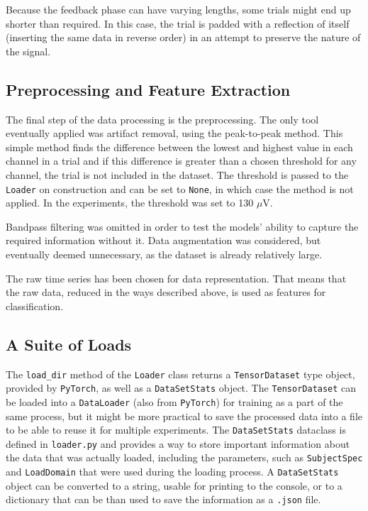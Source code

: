 \documentclass[english, he, bc, kiv, iso690alph]{fasthesis}
\begin{document}
Because the feedback phase can have varying lengths, some trials might end up shorter than required. In this case, the trial is padded with a reflection of itself (inserting the same data in reverse order) in an attempt to preserve the nature of the signal.

\subsection{Preprocessing and Feature Extraction}

The final step of the data processing is the preprocessing. The only tool eventually applied was artifact removal, using the peak-to-peak method. This simple method finds the difference between the lowest and highest value in each channel in a trial and if this difference is greater than a chosen threshold for any channel, the trial is not included in the dataset. The threshold is passed to the \texttt{Loader} on construction and can be set to \texttt{None}, in which case the method is not applied. In the experiments, the threshold was set to 130 $\mu$V.

Bandpass filtering was omitted in order to test the models' ability to capture the required information without it. Data augmentation was considered, but eventually deemed unnecessary, as the dataset is already relatively large.

The raw time series has been chosen for data representation. That means that the raw data, reduced in the ways described above, is used as features for classification.

\subsection{A Suite of Loads}

The \texttt{load\_dir} method of the \texttt{Loader} class returns a \texttt{TensorDataset} type object, provided by \texttt{PyTorch}, as well as a \texttt{DataSetStats} object. The \texttt{TensorDataset} can be loaded into a \texttt{DataLoader} (also from \texttt{PyTorch}) for training as a part of the same process, but it might be more practical to save the processed data into a file to be able to reuse it for multiple experiments. The \texttt{DataSetStats} dataclass is defined in \texttt{loader.py} and provides a way to store important information about the data that was actually loaded, including the parameters, such as \texttt{SubjectSpec} and \texttt{LoadDomain} that were used during the loading process. A \texttt{DataSetStats} object can be converted to a string, usable for printing to the console, or to a dictionary that can be than used to save the information as a \texttt{.json} file.
\end{document}
